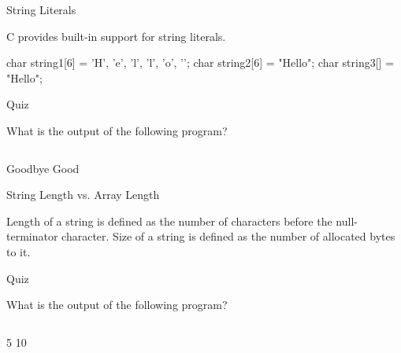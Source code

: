 \documentclass[compress]{beamer}
\begin{document}
\begin{slide}
	\begin{block}{String Literals}

	C provides built-in support for string literals.

	\begin{terminal}
	char string1[6] = {'H', 'e', 'l', 'l', 'o', '\0'};
	char string2[6] = "Hello";
	char string3[] = "Hello";
	\end{terminal}

	\end{block}
\end{slide}

\begin{slide}
	\begin{block}{Quiz}

	What is the output of the following program?

	\inputminted[fontsize=\scriptsize,firstline=10,linenos]{c}{
		\resDirectory/ls06-null.c
	}

	\pause

	\begin{terminal}
	Goodbye Good
	\end{terminal}

	\end{block}
\end{slide}

\begin{slide}
	\begin{block}{String Length vs. Array Length}

	Length of a string is defined as the number of characters before the null-terminator character.
	Size of a string is defined as the number of allocated bytes to it.

	\end{block}
\end{slide}

\begin{slide}
	\begin{block}{Quiz}

	What is the output of the following program?

	\inputminted[fontsize=\scriptsize,firstline=10,linenos]{c}{
		\resDirectory/ls06-strlen.c
	}

	\pause

	\begin{terminal}
	5 10
	\end{terminal}

	\end{block}
\end{slide}
\end{document}
